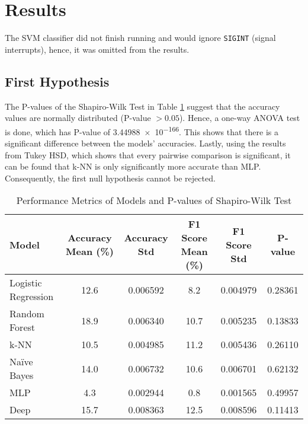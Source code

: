 \section{Results}
The SVM classifier did not finish running and would ignore \verb|SIGINT| (signal interrupts), hence, it was omitted from the results.

\subsection{First Hypothesis}
The P-values of the Shapiro-Wilk Test in Table \ref{tab:model_performance_percentages} suggest that the accuracy values are normally distributed (P-value \(>0.05\)). Hence, a one-way ANOVA test is done, which has P-value of \num{3.44988e-166}. This shows that there is a significant difference between the models' accuracies. Lastly, using the results from Tukey HSD, which shows that every pairwise comparison is significant, it can be found that k-NN is only significantly more accurate than MLP. Consequently, the first null hypothesis cannot be rejected.

\begin{table}[h!]
\centering
\hspace*{-1cm}
\begin{tabular}{|l|c|c|c|c|c|}
\hline
\textbf{Model} & \textbf{Accuracy Mean (\%)} & \textbf{Accuracy Std} & \textbf{F1 Score Mean (\%)} & \textbf{F1 Score Std} & \textbf{P-value} \\ \hline
Logistic Regression & 12.6 & 0.006592 & 8.2 & 0.004979 & 0.28361 \\  \hline
Random Forest       & 18.9 & 0.006340 & 10.7 & 0.005235 &  0.13833 \\ \hline
k-NN                & 10.5 & 0.004985 & 11.2 & 0.005436 & 0.26110 \\ \hline
Naïve Bayes         & 14.0 & 0.006732 & 10.6 & 0.006701 & 0.62132\\ \hline
MLP                 & 4.3  & 0.002944 & 0.8  & 0.001565 & 0.49957 \\ \hline
Deep                & 15.7 & 0.008363 & 12.5 & 0.008596 & 0.11413\\ \hline
\end{tabular}
\caption{Performance Metrics of Models and P-values of Shapiro-Wilk Test}
\label{tab:model_performance_percentages}
\end{table}

